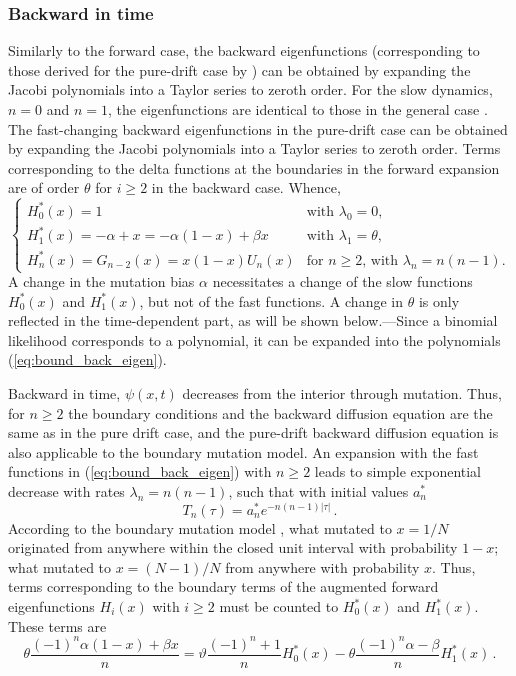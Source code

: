 \documentclass[preprint]{elsarticle}
\begin{document}
\subsubsection{Backward in time}

Similarly to the forward case, the backward eigenfunctions (corresponding to those derived for the pure-drift case by \citet{Song12}) can be obtained by expanding the Jacobi polynomials into a Taylor series to zeroth order. For the slow dynamics, $n=0$ and $n=1$, the eigenfunctions are identical to those in the general case \citep{Song12}. The fast-changing backward eigenfunctions in the pure-drift case \citep{Song12} can be obtained by expanding the Jacobi polynomials into a Taylor series to zeroth order. Terms corresponding to the delta functions at the boundaries in the forward expansion are of order $\theta$ for $i\geq 2$ in the backward case. Whence,
\begin{equation}\label{eq:bound_back_eigen}
    \begin{cases}
    H_0^{*}(x)= 1 &\text{with $\lambda_0=0$,}\\
    H_1^{*}(x)=-\alpha+x=-\alpha(1- x) +\beta x &\text{with $\lambda_1=\theta$,}\\
    H_n^{*}(x)= G_{n-2}(x)=x(1-x)U_n(x) &\text{for $n\geq2$, with $\lambda_n=n(n-1)$.}
    \end{cases}
\end{equation}
A change in the mutation bias $\alpha$ necessitates a change of the slow functions $H_0^{*}(x)$ and $H_1^{*}(x)$, but not of the fast functions. A change in $\theta$ is only reflected in the time-dependent part, as will be shown below.---Since a binomial likelihood corresponds to a polynomial, it can be expanded into the polynomials (\ref{eq:bound_back_eigen}).

Backward in time, $\psi(x,t)$ decreases from the interior through mutation. Thus, for $n\geq 2$ the boundary conditions and the backward diffusion equation are the same as in the pure drift case, and the pure-drift backward diffusion equation is also applicable to the boundary mutation model. An expansion with the fast functions in (\ref{eq:bound_back_eigen}) with $n\geq 2$ leads to simple exponential decrease with rates $\lambda_n=n(n-1)$, such that with initial values $a_n^{*}$
\begin{equation}
    T_n(\tau)=a_n^{*} e^{-n(n-1)|\tau|}\,.
\end{equation}
According to the boundary mutation model \citep{Vogl15}, what mutated to $x=1/N$ originated from anywhere within the closed unit interval with probability $1-x$; what mutated to $x=(N-1)/N$ from anywhere with probability $x$. Thus, terms corresponding to the boundary terms of the augmented forward eigenfunctions $H_i(x)$ with $i\geq 2$ must be counted to $H_0^{*}(x)$ and $H_1^{*}(x)$. These terms are
\begin{equation}
    \theta \frac{(-1)^n \alpha (1-x) +\beta x}{n}=\vartheta\frac{(-1)^n+1}{n}H_0^{*}(x)-\theta\frac{(-1)^n\alpha-\beta}{n}H_1^{*}(x)\,.
\end{equation}
\end{document}
